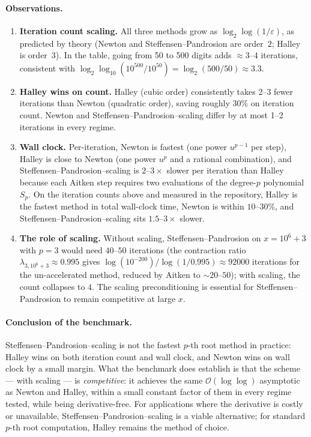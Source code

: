 \documentclass[11pt,a4paper]{article}
\theoremstyle{definition}
\begin{document}
\paragraph{Observations.}
\begin{enumerate}
  \item \textbf{Iteration count scaling.} All three methods grow as $\log_2\log(1/\varepsilon)$, as predicted by theory (Newton and Steffensen--Pandrosion are order~$2$; Halley is order~$3$). In the table, going from 50 to 500 digits adds $\approx 3$--$4$ iterations, consistent with $\log_2 \log_{10}(10^{500}/10^{50}) = \log_2(500/50) \approx 3.3$.
  \item \textbf{Halley wins on count.} Halley (cubic order) consistently takes 2--3 fewer iterations than Newton (quadratic order), saving roughly $30\%$ on iteration count. Newton and Steffensen--Pandrosion--scaling differ by at most 1--2 iterations in every regime.
  \item \textbf{Wall clock.} Per-iteration, Newton is fastest (one power $u^{p-1}$ per step), Halley is close to Newton (one power $u^p$ and a rational combination), and Steffensen--Pandrosion--scaling is $2$--$3\times$ slower per iteration than Halley because each Aitken step requires two evaluations of the degree-$p$ polynomial $S_p$. On the iteration counts above and measured in the repository, Halley is the fastest method in total wall-clock time, Newton is within $10$--$30\%$, and Steffensen--Pandrosion--scaling sits $1.5$--$3\times$ slower.
  \item \textbf{The role of scaling.} Without scaling, Steffensen--Pandrosion on $x = 10^6 + 3$ with $p = 3$ would need $40$--$50$ iterations (the contraction ratio $\lambda_{3, 10^6+3} \approx 0.995$ gives $\log(10^{-200})/\log(1/0.995) \approx 92000$ iterations for the un-accelerated method, reduced by Aitken to $\sim 20$--$50$); with scaling, the count collapses to $4$. The scaling preconditioning is essential for Steffensen--Pandrosion to remain competitive at large $x$.
\end{enumerate}

\paragraph{Conclusion of the benchmark.} Steffensen--Pandrosion--scaling is not the fastest $p$-th root method in practice: Halley wins on both iteration count and wall clock, and Newton wins on wall clock by a small margin. What the benchmark does establish is that the scheme --- with scaling --- is \emph{competitive}: it achieves the same $\mathcal{O}(\log\log)$ asymptotic as Newton and Halley, within a small constant factor of them in every regime tested, while being derivative-free. For applications where the derivative is costly or unavailable, Steffensen--Pandrosion--scaling is a viable alternative; for standard $p$-th root computation, Halley remains the method of choice.
\end{document}

